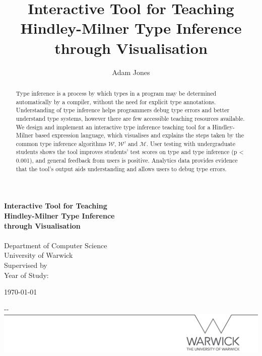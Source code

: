 \documentclass[a4paper,fleqn,oneside,12pt]{report}
\author{Adam Jones}
\title{Interactive Tool for Teaching Hindley-Milner Type Inference through Visualisation}
\makeatletter
\newcommand{\W}{$\mathcal{W}$}
\newcommand{\M}{$\mathcal{M}$}
\newcommand{\@supervisor}[0]{}
\newcommand{\@yearofstudy}[0]{}
\makeatother
\begin{document}
\makeatletter
\begin{titlepage}

	\textbf{\Huge Interactive Tool for Teaching\\Hindley-Milner Type Inference\\through Visualisation} \\[1.5cm]
    \Large \textbf{\@author} \\
    Department of Computer Science \\
    University of Warwick \\

	Supervised by \@supervisor \\
	Year of Study: \@yearofstudy \\

    \vfill

    \today

    \begin{adjustwidth}{-\oddsidemargin-1in}{-\rightmargin}
        \centering
        \includegraphics[width=\paperwidth]{./line.png}
    \end{adjustwidth}

    \vspace*{-3.5cm}

\end{titlepage}
\makeatother

\pagestyle{plain}

\begin{abstract}
  Type inference is a process by which types in a program may be determined automatically by a compiler, without the need for explicit type annotations. Understanding of type inference helps programmers debug type errors and better understand type systems, however there are few accessible teaching resources available. We design and implement an interactive type inference teaching tool for a Hindley-Milner based expression language, which visualises and explains the steps taken by the common type inference algorithms \W, \W' and \M. User testing with undergraduate students shows the tool improves students' test scores on type and type inference (p < 0.001), and general feedback from users is positive. Analytics data provides evidence that the tool's output aids understanding and allows users to debug type errors.
\end{abstract}
\end{document}
